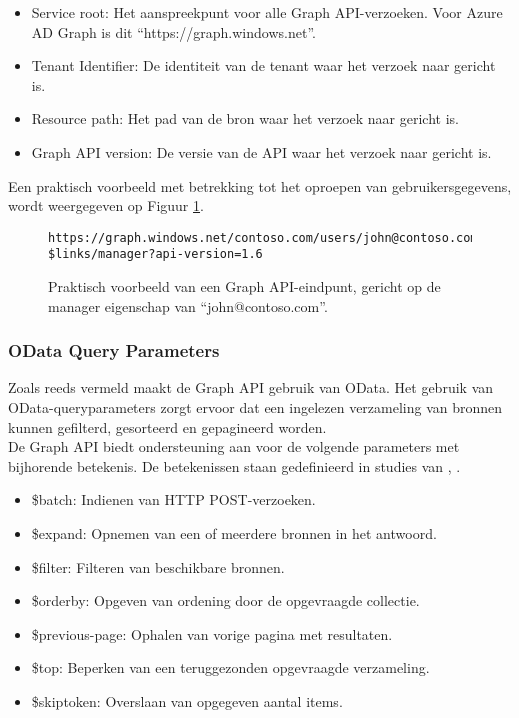 \begin{itemize}
    \item Service root: Het aanspreekpunt voor alle Graph \ac{API}-verzoeken. Voor Azure \ac{AD} Graph is dit “https://graph.windows.net”.
    \item Tenant Identifier: De identiteit van de tenant waar het verzoek naar gericht is.
    \item Resource path: Het pad van de bron waar het verzoek naar gericht is.
    \item Graph \ac{API} version: De versie van de \ac{API} waar het verzoek naar gericht is.
\end{itemize}

Een praktisch voorbeeld met betrekking tot het oproepen van gebruikersgegevens, wordt weergegeven op Figuur \ref{pfe}. \\

\begin{figure}[h]
    \footnotesize\begin{verbatim}https://graph.windows.net/contoso.com/users/john@contoso.com/
$links/manager?api-version=1.6
    \end{verbatim}    
    \caption[Voorbeeld Graph API-eindpunt]{Praktisch voorbeeld van een Graph \ac{API}-eindpunt, gericht op de manager eigenschap van “john@contoso.com”.}
    \label{pfe}
\end{figure}



\subsubsection{OData Query Parameters}

Zoals reeds vermeld maakt de Graph \ac{API} gebruik van OData. Het gebruik van OData-queryparameters zorgt ervoor dat een ingelezen verzameling van bronnen kunnen gefilterd, gesorteerd en gepagineerd worden. \\

De Graph \ac{API} biedt ondersteuning aan voor de volgende parameters met bijhorende betekenis. De betekenissen staan gedefinieerd in studies van \textcite{Liang2016}, \textcite{Wojcieszyn2014}. 

\begin{itemize}
    \item \$batch: Indienen van \ac{HTTP} POST-verzoeken.
    \item \$expand: Opnemen van een of meerdere bronnen in het antwoord.
    \item \$filter: Filteren van beschikbare bronnen.
    \item \$orderby: Opgeven van ordening door de opgevraagde collectie.
    \item \$previous-page: Ophalen van vorige pagina met resultaten.
    \item \$top: Beperken van een teruggezonden opgevraagde verzameling.
    \item \$skiptoken: Overslaan van opgegeven aantal items.
\end{itemize}

